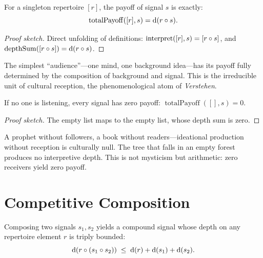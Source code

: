 \begin{theorem}
\label{thm:singleton-payoff}
For a singleton repertoire $[r]$, the payoff of signal $s$ is exactly:
\[
  \operatorname{totalPayoff}([r], s) = \operatorname{d}(r \circ s).
\]
\end{theorem}

\begin{proof}[Proof sketch]
Direct unfolding of definitions: $\operatorname{interpret}([r], s) =
[r \circ s]$, and $\operatorname{depthSum}([r \circ s]) =
\operatorname{d}(r \circ s)$.
\end{proof}

The simplest ``audience''---one mind, one background idea---has its payoff
fully determined by the composition of background and signal.  This is the
irreducible unit of cultural reception, the phenomenological atom of
\emph{Verstehen}.

\begin{theorem}
\label{thm:empty-rep-zero}
If no one is listening, every signal has zero payoff:
$\operatorname{totalPayoff}([], s) = 0$.
\end{theorem}

\begin{proof}[Proof sketch]
The empty list maps to the empty list, whose depth sum is zero.
\end{proof}

A prophet without followers, a book without readers---ideational production
without reception is culturally null.  The tree that falls in an empty forest
produces no interpretive depth.  This is not mysticism but arithmetic: zero
receivers yield zero payoff.

\section{Competitive Composition}
\label{sec:ch11-comp}

\begin{theorem}
\label{thm:composed-signal-bound}
Composing two signals $s_1, s_2$ yields a compound signal whose depth on
any repertoire element $r$ is triply bounded:
\[
  \operatorname{d}(r \circ (s_1 \circ s_2))
  \;\le\; \operatorname{d}(r) + \operatorname{d}(s_1) + \operatorname{d}(s_2).
\]
\end{theorem}


